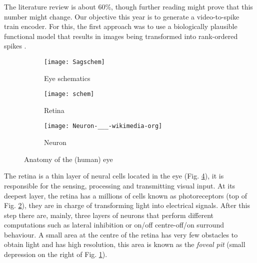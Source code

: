 The literature review is about 60\%, though further reading might prove that 
this number might change. Our objective this year is to generate a 
video-to-spike train encoder. For this, the first approach was to use a
biologically plausible functional model \cite{basab-model} that results in
images being transformed into rank-ordered spikes 
\cite{thorpe-spike-rapid-processing}.

\begin{figure}[hbt]
  \centering
  \begin{subfigure}[b]{0.15\textwidth}
    \centering
    \texttt{[image: Sagschem]}
    \caption{Eye schematics}
    \label{sub-fig-eye-schematics}
  \end{subfigure}
  \begin{subfigure}[b]{0.15\textwidth}
    \centering
    \texttt{[image: schem]}
    \caption{Retina}
    \label{sub-fig-retinal-layers}
  \end{subfigure}
  \begin{subfigure}[b]{0.15\textwidth}
    \centering
    \texttt{[image: Neuron-\_\_\_-wikimedia-org]}
    \caption{Neuron}
    \label{sub-fig-neuron}
  \end{subfigure}
  
  \caption{Anatomy of the (human) eye }
  \label{fig-basic-eye-anatomy}
\end{figure}

The retina is a thin layer of neural cells located in the eye (Fig. 
\ref{fig-basic-eye-anatomy}), it is responsible
for the sensing, processing and transmitting visual input\cite{webvision}. 
At its deepest layer, the retina has a millions of cells known as 
photoreceptors (top of Fig. \ref{sub-fig-retinal-layers}), they are in charge 
of transforming light into electrical 
signals. After this step there are, mainly, three layers of neurons that 
perform different computations such as lateral inhibition or on/off 
centre-off/on surround behaviour\cite{webvision-midget}. A small area 
at the centre of the retina has very few obstacles to obtain light and has high
resolution, this area is known as the \emph{foveal pit} (small depression on 
the right of Fig. \ref{sub-fig-eye-schematics}).

